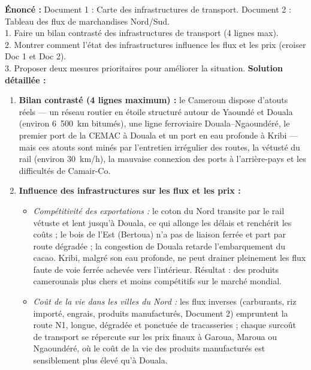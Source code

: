 \documentclass[11pt]{article}
\begin{document}
\begin{corrige}
\textbf{Énoncé :} Document 1 : Carte des infrastructures de transport. Document 2 : Tableau des flux de marchandises Nord/Sud.\\
1. Faire un bilan contrasté des infrastructures de transport (4 lignes max).\\
2. Montrer comment l'état des infrastructures influence les flux et les prix (croiser Doc 1 et Doc 2).\\
3. Proposer deux mesures prioritaires pour améliorer la situation.
\tcblower
\textbf{Solution détaillée :}
\begin{enumerate}
    \item \textbf{Bilan contrasté (4 lignes maximum) :} le Cameroun dispose d'atouts réels — un réseau routier en étoile structuré autour de Yaoundé et Douala (environ 6~500~km bitumés), une ligne ferroviaire Douala--Ngaoundéré, le premier port de la CEMAC à Douala et un port en eau profonde à Kribi — mais ces atouts sont minés par l'entretien irrégulier des routes, la vétusté du rail (environ 30~km/h), la mauvaise connexion des ports à l'arrière-pays et les difficultés de Camair-Co.

    \item \textbf{Influence des infrastructures sur les flux et les prix :}
    \begin{itemize}
        \item \emph{Compétitivité des exportations :} le coton du Nord transite par le rail vétuste et lent jusqu'à Douala, ce qui allonge les délais et renchérit les coûts ; le bois de l'Est (Bertoua) n'a pas de liaison ferrée et part par route dégradée ; la congestion de Douala retarde l'embarquement du cacao. Kribi, malgré son eau profonde, ne peut drainer pleinement les flux faute de voie ferrée achevée vers l'intérieur. Résultat : des produits camerounais plus chers et moins compétitifs sur le marché mondial.
        \item \emph{Coût de la vie dans les villes du Nord :} les flux inverses (carburants, riz importé, engrais, produits manufacturés, Document 2) empruntent la route N1, longue, dégradée et ponctuée de tracasseries ; chaque surcoût de transport se répercute sur les prix finaux à Garoua, Maroua ou Ngaoundéré, où le coût de la vie des produits manufacturés est sensiblement plus élevé qu'à Douala.
    \end{itemize}


\end{enumerate}
\end{corrige}
\end{document}
